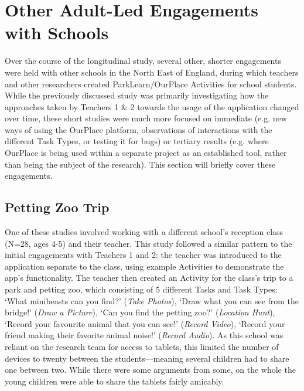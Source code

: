 \section{Other Adult-Led Engagements with Schools}
Over the course of the longitudinal study, several other, shorter engagements were held with other schools in the North East of England, during which teachers and other researchers created ParkLearn/OurPlace Activities for school students. While the previously discussed study was primarily investigating how the approaches taken by Teachers 1 \& 2 towards the usage of the application changed over time, these short studies were much more focused on immediate (e.g. new ways of using the OurPlace platform, observations of interactions with the different Task Types, or testing it for bugs) or tertiary results (e.g. where OurPlace is being used within a separate project as an established tool, rather than being the subject of the research). This section will briefly cover these engagements.

\subsection{Petting Zoo Trip}
One of these studies involved working with a different school's reception class (N=28, ages 4-5) and their teacher. This study followed a similar pattern to the initial engagements with Teachers 1 and 2: the teacher was introduced to the application separate to the class, using example Activities to demonstrate the app's functionality. The teacher then created an Activity for the class's trip to a park and petting zoo, which consisting of 5 different Tasks and Task Types: `What minibeasts can you find?' (\textit{Take Photos}), `Draw what you can see from the bridge!' (\textit{Draw a Picture}), `Can you find the petting zoo?' (\textit{Location Hunt}), `Record your favourite animal that you can see!' (\textit{Record Video}), `Record your friend making their favorite animal noise!' (\textit{Record Audio}). As this school was reliant on the research team for access to tablets, this limited the number of devices to twenty between the students---meaning several children had to share one between two. While there were some arguments from some, on the whole the young children were able to share the tablets fairly amicably. 

